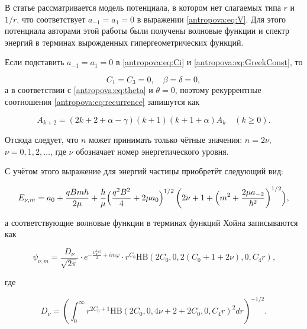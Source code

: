 В статье \cite{antropova:bib:TanInkson1996} рассматривается модель потенциала, в котором нет слагаемых типа $r$ и $1/r$, что соответствует $a_{-1} = a_1 = 0$ в выражении \eqref{antropova:eq:V}. Для этого потенциала авторами этой работы были получены волновые функции и спектр энергий в терминах вырожденных гипергеометрических функций.

Если подставить $a_{-1} = a_1 = 0$ в \eqref{antropova:eq:Ci} и \eqref{antropova:eq:GreekConst}, то 

$$C_1 = C_3 = 0,\quad  \beta = \delta = 0,$$ а в соответствии с \eqref{antropova:eq:theta} и  $\theta = 0$, поэтому рекуррентные соотношения \eqref{antropova:eq:recurrence} запишутся как

\begin{equation*}

    A_{k + 2} = (2k + 2 + \alpha - \gamma)(k + 1)(k + 1 + \alpha)A_k\quad(k\geq0)\text{.}

\end{equation*}

Отсюда следует, что $n$ может принимать только чётные значения: $n = 2\nu$, $\nu = 0, 1, 2, \dotsc$, где $\nu$ обозначает номер энергетического уровня.

С учётом этого выражение для энергий частицы приобретёт следующий вид:

$$

E_{\nu,m} = a_0 + \frac{qBm\hbar}{2\mu} + \frac{\hbar}{\mu}\Bigl(\frac{q^2B^2}{4} + 2\mu{}a_0\Bigr)^{1/2}\left(2\nu + 1 + \Bigl(m^2 + \frac{2\mu{}a_{-2}}{\hbar^2}\right)^{1/2}\Bigr),

$$

а соответствующие волновые функции в терминах функций Хойна записываются как

\begin{equation*}

\psi_{\nu,m} = \frac{D_{\nu}}{\sqrt{2\pi}}\cdot{}e^{-\frac{C_4^2r^2}{2}+im\varphi}\cdot{}r^{C_0}\text{HB}(2C_0, 0, 2(C_0 + 1 + 2\nu), 0, C_4r)\text{,}

\end{equation*}

где

\begin{equation*}

D_{\nu} = \left(\int_0^{\infty} r^{2C_0+1}\text{HB}(2C_0, 0, 4\nu + 2 + 2C_0, 0, C_4r)^2 dr \right)^{-1/2}\text{.}

\end{equation*}



